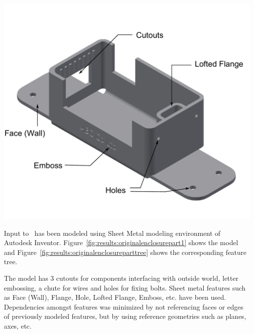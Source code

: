 \begin{minipage}{\linewidth}
\begin{minipage}[c]{0.62\linewidth}
\includegraphics[width=\linewidth,valign=t]{images/SheetMetal_Medium_Enclosure_OriginalPart_2}
 \label{fig:results:originalenclosurepart1}

Input to \mysystemname~has been modeled using Sheet Metal modeling environment of Autodesk Inventor. Figure~\ref{fig:results:originalenclosurepart1} shows the model and Figure~\ref{fig:results:originalenclosureparttree} shows the corresponding feature tree.

The model has 3 cutouts for components interfacing with outside world, letter embossing, a chute for wires and holes for fixing bolts. Sheet metal features such as Face (Wall), Flange, Hole, Lofted Flange, Emboss, etc. have been used. Dependencies amongst features was minimized by not referencing faces or edges of previously modeled features, but by using reference geometries such as planes, axes, etc. 


\end{minipage}
\end{minipage}
